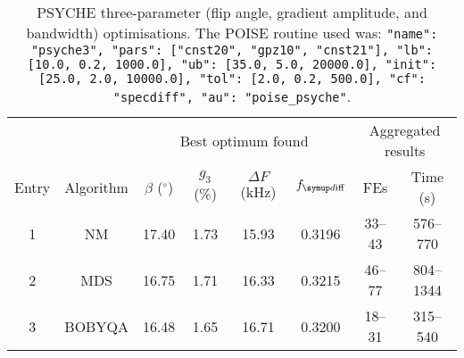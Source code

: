\begin{table}
    \centering
    \begin{tabular}{cccccccc}
        \toprule
              &           & \multicolumn{4}{c}{Best optimum found} & \multicolumn{2}{c}{Aggregated results} \\
                            \cmidrule(lr){3-6}                     \cmidrule(lr){7-8}
        Entry & Algorithm & $\beta$ ($^\circ$) & $g_3$ (\%) & $\Delta F$ (\unit{\kHz}) & $\fdiff$ & FEs    & Time (\unit{\s}) \\
        \midrule
        1     & NM        & 17.40              & 1.73       & 15.93                  & 0.3196          & 33--43 & 576--770             \\
        2     & MDS       & 16.75              & 1.71       & 16.33                  & 0.3215          & 46--77 & 804--1344            \\
        3     & BOBYQA    & 16.48              & 1.65       & 16.71                  & 0.3200          & 18--31 & 315--540             \\
        \bottomrule
    \end{tabular}
    \caption[PSYCHE three-parameter optimisations]{
        PSYCHE three-parameter (flip angle, gradient amplitude, and bandwidth) optimisations.
        The POISE routine used was: \texttt{{"name": "psyche3", "pars": ["cnst20", "gpz10", "cnst21"], "lb": [10.0, 0.2, 1000.0], "ub": [35.0, 5.0, 20000.0], "init": [25.0, 2.0, 10000.0], "tol": [2.0, 0.2, 500.0], "cf": "specdiff", "au": "poise_psyche"}}.
    }
    \label{tbl:poise_psyche3p}
\end{table}

